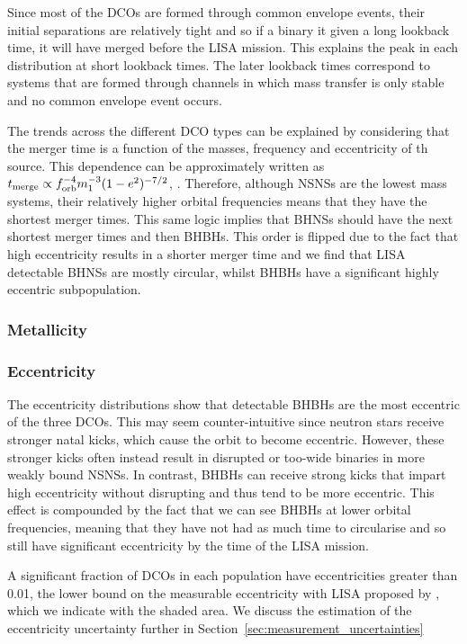 Since most of the DCOs are formed through common envelope events, their initial separations are relatively tight and so if a binary it given a long lookback time, it will have merged before the LISA mission. This explains the peak in each distribution at short lookback times. The later lookback times correspond to systems that are formed through channels in which mass transfer is only stable and no common envelope event occurs.

The trends across the different DCO types can be explained by considering that the merger time is a function of the masses, frequency and eccentricity of th source. This dependence can be approximately written as $t_{\rm merge} \propto f_{\rm orb}^{-4} m_1^{-3} (1 - e^2)^{-7/2}$,  \citep[][Eq.~5.14]{Peters+1964}. Therefore, although NSNSs are the lowest mass systems, their relatively higher orbital frequencies means that they have the shortest merger times. This same logic implies that BHNSs should have the next shortest merger times and then BHBHs. This order is flipped due to the fact that high eccentricity results in a shorter merger time and we find that LISA detectable BHNSs are mostly circular, whilst BHBHs have a significant highly eccentric subpopulation.

\subsubsection{Metallicity}

\subsubsection{Eccentricity}
The eccentricity distributions show that detectable BHBHs are the most eccentric of the three DCOs. This may seem counter-intuitive since neutron stars receive stronger natal kicks, which cause the orbit to become eccentric. However, these stronger kicks often instead result in disrupted or too-wide binaries in more weakly bound NSNSs. In contrast, BHBHs can receive strong kicks that impart high eccentricity without disrupting and thus tend to be more eccentric. This effect is compounded by the fact that we can see BHBHs at lower orbital frequencies, meaning that they have not had as much time to circularise and so still have significant eccentricity by the time of the LISA mission.

A significant fraction of DCOs in each population have eccentricities greater than 0.01, the lower bound on the measurable eccentricity with LISA proposed by \citet{Nishizawa+2016}, which we indicate with the shaded area. We discuss the estimation of the eccentricity uncertainty further in Section~\ref{sec:measurement_uncertainties}

